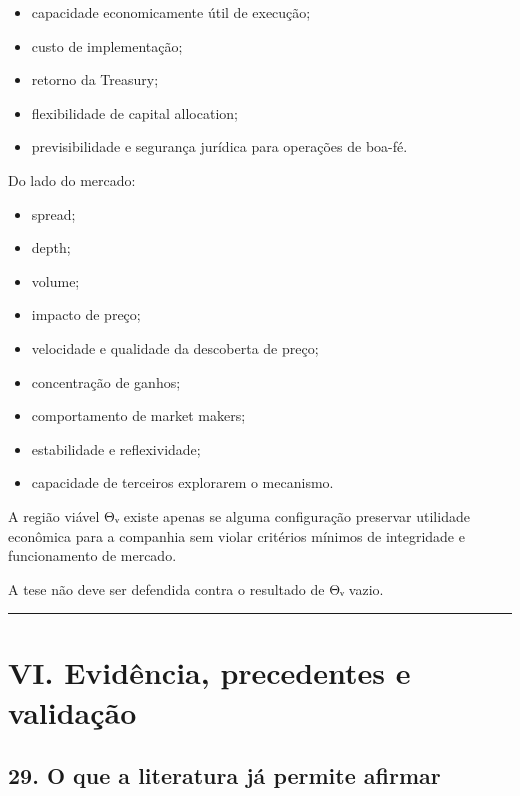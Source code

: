 \documentclass[
  a4paper,
]{article}
\providecommand{\tightlist}{%
  \setlength{\itemsep}{0pt}\setlength{\parskip}{0pt}}
\begin{document}
\begin{itemize}
\tightlist
\item
  capacidade economicamente útil de execução;
\item
  custo de implementação;
\item
  retorno da Treasury;
\item
  flexibilidade de capital allocation;
\item
  previsibilidade e segurança jurídica para operações de boa-fé.
\end{itemize}

Do lado do mercado:

\begin{itemize}
\tightlist
\item
  spread;
\item
  depth;
\item
  volume;
\item
  impacto de preço;
\item
  velocidade e qualidade da descoberta de preço;
\item
  concentração de ganhos;
\item
  comportamento de market makers;
\item
  estabilidade e reflexividade;
\item
  capacidade de terceiros explorarem o mecanismo.
\end{itemize}

A região viável Θᵥ existe apenas se alguma configuração preservar
utilidade econômica para a companhia sem violar critérios mínimos de
integridade e funcionamento de mercado.

A tese não deve ser defendida contra o resultado de Θᵥ vazio.

\begin{center}\rule{0.5\linewidth}{0.5pt}\end{center}

\hypertarget{vi-evidencia-precedentes-e-validacao}{}

\hypertarget{vi-eviduxeancia-precedentes-e-validauxe7uxe3o-1}{%
\section{VI. Evidência, precedentes e
validação}\label{vi-eviduxeancia-precedentes-e-validauxe7uxe3o-1}}

\hypertarget{29-o-que-a-literatura-ja-permite-afirmar}{}

\hypertarget{29-o-que-a-literatura-juxe1-permite-afirmar}{%
\subsection{29. O que a literatura já permite
afirmar}\label{29-o-que-a-literatura-juxe1-permite-afirmar}}
\end{document}
